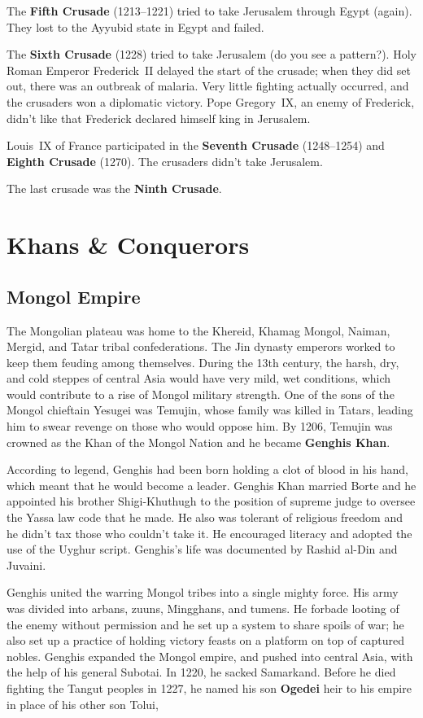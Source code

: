 The \textbf{Fifth Crusade} (1213--1221) tried to take Jerusalem through Egypt (again).
They lost to the Ayyubid state in Egypt and failed.

The \textbf{Sixth Crusade} (1228) tried to take Jerusalem (do you see a pattern?).
Holy Roman Emperor Frederick~II delayed the start of the crusade;
when they did set out, there was an outbreak of malaria.
Very little fighting actually occurred, and the crusaders won a diplomatic victory.
Pope Gregory~IX, an enemy of Frederick,
didn't like that Frederick declared himself king in Jerusalem.

Louis~IX of France participated in
the \textbf{Seventh Crusade} (1248--1254) and \textbf{Eighth Crusade} (1270).
The crusaders didn't take Jerusalem.

The last crusade was the \textbf{Ninth Crusade}.

\section{Khans \& Conquerors}

\subsection*{Mongol Empire}

The Mongolian plateau was home to the
Khereid, Khamag Mongol, Naiman, Mergid, and Tatar tribal confederations.
The Jin dynasty emperors worked to keep them feuding among themselves.
During the 13th century,
the harsh, dry, and cold steppes of central Asia would have very mild, wet conditions,
which would contribute to a rise of Mongol military strength.
One of the sons of the Mongol chieftain Yesugei was Temujin,
whose family was killed in Tatars, leading him to swear revenge on those who would oppose him.
By 1206, Temujin was crowned as the Khan of the Mongol Nation and he became \textbf{Genghis Khan}.

According to legend, Genghis had been born holding a clot of blood in his hand,
which meant that he would become a leader.
Genghis Khan married Borte
and he appointed his brother Shigi-Khuthugh to the position of supreme judge
to oversee the Yassa law code that he made.
He also was tolerant of religious freedom and he didn't tax those who couldn't take it.
He encouraged literacy and adopted the use of the Uyghur script.
Genghis's life was documented by Rashid al-Din and Juvaini.

Genghis united the warring Mongol tribes into a single mighty force.
His army was divided into arbans, zuuns, Mingghans, and tumens.
He forbade looting of the enemy without permission and he set up a system to share spoils of war;
he also set up a practice of holding victory feasts on a platform on top of captured nobles.
Genghis expanded the Mongol empire,
and pushed into central Asia, with the help of his general Subotai.
In 1220, he sacked Samarkand.
Before he died fighting the Tangut peoples in 1227,
he named his son \textbf{Ogedei} heir to his empire in place of his other son Tolui,

